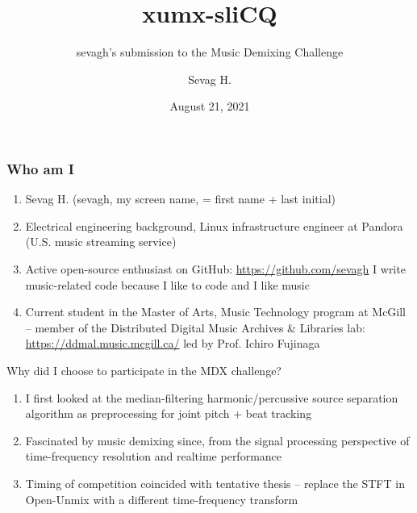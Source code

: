 \documentclass[usenames,dvipsnames]{beamer}
\title{xumx-sliCQ}
\subtitle{sevagh's submission to the Music Demixing Challenge}
\author{Sevag H.}
\date{August 21, 2021}
\begin{document}
\begin{frame}
\maketitle
\end{frame}

\begin{frame}
	\frametitle{Who am I}
	\begin{enumerate}
		\item
			Sevag H. (sevagh, my screen name, = first name + last initial)
		\item
			Electrical engineering background, Linux infrastructure engineer at Pandora (U.S. music streaming service)
		\item
			Active open-source enthusiast on GitHub: \href{https://github.com/sevagh}{https://github.com/sevagh}
			I write music-related code because I like to code and I like music
		\item
			Current student in the Master of Arts, Music Technology program at McGill -- member of the Distributed Digital Music Archives \& Libraries lab: \href{https://ddmal.music.mcgill.ca/}{https://ddmal.music.mcgill.ca/} led by Prof. Ichiro Fujinaga
	\end{enumerate}
	Why did I choose to participate in the MDX challenge?
	\begin{enumerate}
		\item
			I first looked at the median-filtering harmonic/percussive source separation algorithm as preprocessing for joint pitch + beat tracking
		\item
			Fascinated by music demixing since, from the signal processing perspective of time-frequency resolution and realtime performance
		\item
			Timing of competition coincided with tentative thesis -- replace the STFT in Open-Unmix with a different time-frequency transform
	\end{enumerate}
\end{frame}
\end{document}
